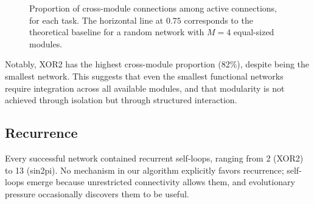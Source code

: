 \begin{figure}[h]
  \centering
  \caption{Proportion of cross-module connections among active
    connections, for each task. The horizontal line at $0.75$
    corresponds to the theoretical baseline for a random network with
    $M=4$ equal-sized modules.}
  \label{fig:cross-module}
\end{figure}

Notably, XOR2 has the highest cross-module proportion (82\%),
despite being the smallest network. This suggests that even the
smallest functional networks require integration across all
available modules, and that modularity is not achieved through
isolation but through structured interaction.

\subsection{Recurrence}
\label{sec:results-recurrence}

Every successful network contained recurrent self-loops, ranging
from 2 (XOR2) to 13 (sin2pi). No mechanism in our algorithm explicitly
favors recurrence; self-loops emerge because unrestricted connectivity
allows them, and evolutionary pressure occasionally discovers them
to be useful.

